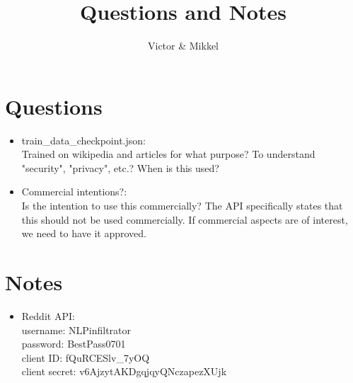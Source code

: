 \documentclass{article}
\begin{document}
\title{Questions and Notes}
\author{Victor \& Mikkel}

\maketitle

\section{Questions}
\begin{itemize}
	\item train\_data\_checkpoint.json:\\
	Trained on wikipedia and articles for what purpose?
	To understand "security", "privacy", etc.?
	When is this used?
	\item Commercial intentions?:\\
	Is the intention to use this commercially?
	The API specifically states that this should not be used commercially.
	If commercial aspects are of interest, we need to have it approved.


\end{itemize}

\section{Notes}
\begin{itemize}
	\item Reddit API:\\
	username: NLPinfiltrator\\
	password: BestPass0701\\
	client ID: fQuRCESlv\_7yOQ\\
	client secret: v6AjzytAKDgqjqyQNczapezXUjk
\end{itemize}
\end{document}

